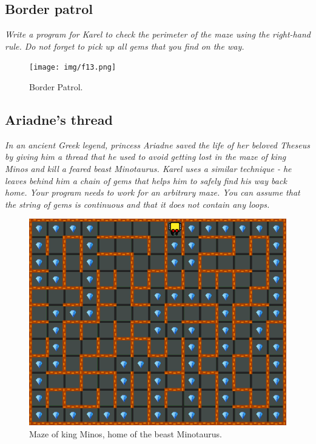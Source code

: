 \subsection{Border patrol}

{\em Write a program for Karel to check the perimeter of the maze using the 
right-hand rule. Do not forget to pick up all gems that you find on the way.}

\begin{figure}[!ht]
\begin{center}
\texttt{[image: img/f13.png]}
\end{center}
\vspace{-4mm}
\caption{Border Patrol.}
\label{fig:f13}
\vspace{-1cm}
\end{figure}
\newpage



\subsection{Ariadne's thread}

{\em In an ancient Greek legend, princess Ariadne saved the life of her 
beloved Theseus by giving him a thread that he used to avoid getting lost 
in the maze of king Minos and kill a feared beast Minotaurus. Karel uses 
a similar technique - he leaves behind him a chain of gems that helps him 
to safely find his way back home. Your program needs to work for an 
arbitrary maze. You can assume that the string of gems is continuous 
and that it does not contain any loops.}


\begin{figure}[!ht]
\begin{center}
\includegraphics[height=0.4\textwidth]{img/f14.png}
\end{center}
\vspace{-4mm}
\caption{Maze of king Minos, home of the beast Minotaurus.}
\label{fig:f14}
\end{figure}

